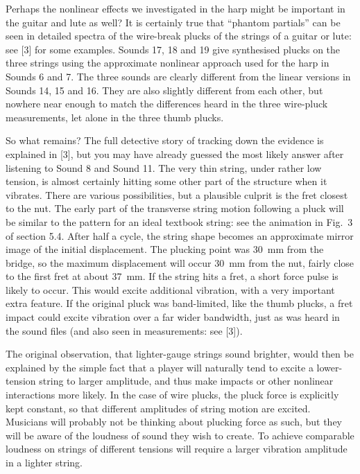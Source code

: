 \audio{}

\audio{}

\audio{}

  Perhaps the nonlinear effects we investigated in the harp might be important 
  in the guitar and lute as well? It is certainly true that “phantom partials” 
  can be seen in detailed spectra of the wire-break plucks of the strings of a 
  guitar or lute: see [3] for some examples. Sounds 17, 18 and 19 give 
  synthesised plucks on the three strings using the approximate nonlinear 
  approach used for the harp in Sounds 6 and 7. The three sounds are clearly 
  different from the linear versions in Sounds 14, 15 and 16. They are also 
  slightly different from each other, but nowhere near enough to match the 
  differences heard in the three wire-pluck measurements, let alone in the 
  three thumb plucks. 

\audio{}

\audio{}

\audio{}

  So what remains? The full detective story of tracking down the evidence is 
  explained in [3], but you may have already guessed the most likely answer 
  after listening to Sound 8 and Sound 11. The very thin string, under rather 
  low tension, is almost certainly hitting some other part of the structure 
  when it vibrates. There are various possibilities, but a plausible culprit is 
  the fret closest to the nut. The early part of the transverse string motion 
  following a pluck will be similar to the pattern for an ideal textbook 
  string: see the animation in Fig.\ 3 of section 5.4. After half a cycle, the 
  string shape becomes an approximate mirror image of the initial displacement. 
  The plucking point was 30~mm from the bridge, so the maximum displacement 
  will occur 30~mm from the nut, fairly close to the first fret at about 37~mm. 
  If the string hits a fret, a short force pulse is likely to occur. This would 
  excite additional vibration, with a very important extra feature. If the 
  original pluck was band-limited, like the thumb plucks, a fret impact could 
  excite vibration over a far wider bandwidth, just as was heard in the sound 
  files (and also seen in measurements: see [3]). 

  The original observation, that lighter-gauge strings sound brighter, would 
  then be explained by the simple fact that a player will naturally tend to 
  excite a lower-tension string to larger amplitude, and thus make impacts or 
  other nonlinear interactions more likely. In the case of wire plucks, the 
  pluck force is explicitly kept constant, so that different amplitudes of 
  string motion are excited. Musicians will probably not be thinking about 
  plucking force as such, but they will be aware of the loudness of sound they 
  wish to create. To achieve comparable loudness on strings of different 
  tensions will require a larger vibration amplitude in a lighter string. 

